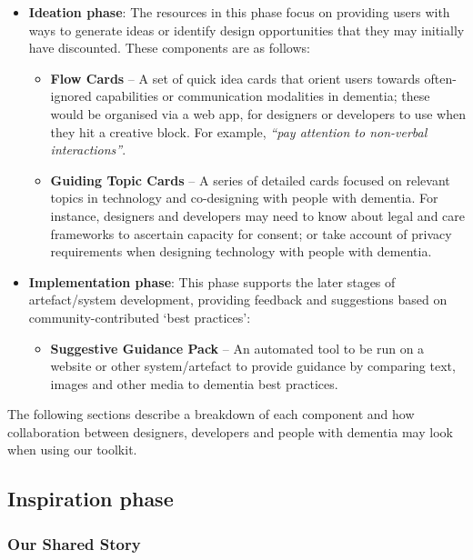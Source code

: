 \begin{itemize}
    \item \textbf{Ideation phase}: The resources in this phase focus on providing users with ways to generate ideas or identify design opportunities that they may initially have discounted. These components are as follows:
    \begin{itemize}
        \item \textbf{Flow Cards} – A set of quick idea cards that orient users towards often-ignored capabilities or communication modalities in dementia; these would be organised via a web app, for designers or developers to use when they hit a creative block. For example, \textit{``pay attention to non-verbal interactions''}.
        \item \textbf{Guiding Topic Cards} – A series of detailed cards focused on relevant topics in technology and co-designing with people with dementia. For instance, designers and developers may need to know about legal and care frameworks to ascertain capacity for consent; or take account of privacy requirements when designing technology with people with dementia.
    \end{itemize}
\end{itemize}

\begin{itemize}
    \item \textbf{Implementation phase}: This phase supports the later stages of artefact/system development, providing feedback and suggestions based on community-contributed `best practices': 
    \begin{itemize}
        \item \textbf{Suggestive Guidance Pack} – An automated tool to be run on a website or other system/artefact to provide guidance by comparing text, images and other media to dementia best practices. 
    \end{itemize}
\end{itemize}

The following sections describe a breakdown of each component and how collaboration between designers, developers and people with dementia may look when using our toolkit. 

\subsection{Inspiration phase}
\subsubsection{Our Shared Story}


